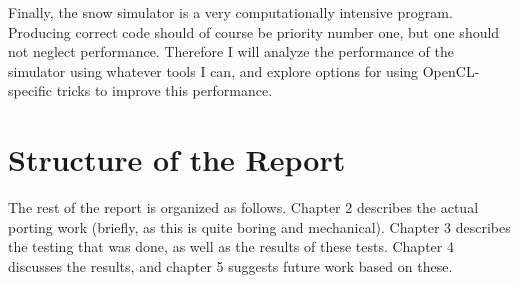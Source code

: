 Finally, the snow simulator is a very computationally intensive program. Producing correct code should of course be priority number one, but one should not neglect performance. Therefore I will analyze the performance of the simulator using whatever tools I can, and explore options for using OpenCL-specific tricks to improve this performance.

\section{Structure of the Report}
The rest of the report is organized as follows. Chapter 2 describes the actual porting work (briefly, as this is quite boring and mechanical). Chapter 3 describes the testing that was done, as well as the results of these tests. Chapter 4 discusses the results, and chapter 5 suggests future work based on these.